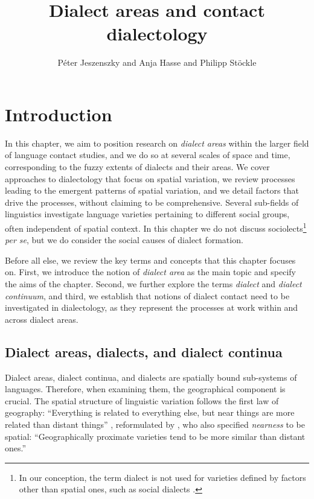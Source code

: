 \documentclass[output=paper]{langscibook}
\title{Dialect areas and contact dialectology}
\author{Péter Jeszenszky\affiliation{University of Bern} and  Anja Hasse\affiliation{University of Zurich} and  Philipp Stöckle\affiliation{Austrian Academy of Sciences, Vienna}}
\begin{document}
\maketitle
\label{chap_dialects}

\section{Introduction} 
\label{Section:Introduction}

In this chapter, we aim to position research on \textit{dialect areas} within the larger field of language contact studies, and we do so at several scales of space and time, corresponding to the fuzzy extents of dialects and their areas. We cover approaches to dialectology that focus on spatial variation, we review processes leading to the emergent patterns of spatial variation, and we detail factors that drive the processes, without claiming to be comprehensive.
Several sub-fields of linguistics investigate language varieties pertaining to different social groups, often independent of spatial context. In this chapter we do not discuss sociolects\footnote{In our conception, the term dialect is not used for varieties defined by factors other than spatial ones, such as social dialects \parencite[cf.][7--9]{Chambers2004}.}
\textit{per se}, but we do consider the social causes of dialect formation.

Before all else, we review the key terms and concepts that this chapter focuses on. First, we introduce the notion of \textit{dialect area} as the main topic and specify the aims of the chapter. Second, we further explore the terms \textit{dialect} and \textit{dialect continuum}, and third, we establish that notions of dialect contact need to be investigated in dialectology, as they represent the processes at work within and across dialect areas.

\subsection{Dialect areas, dialects, and dialect continua}
\label{Intro:Dialects_and_dialect_areas}
Dialect areas, dialect continua, and dialects are spatially bound sub-systems of languages. Therefore, when examining them, the geographical component is crucial. The spatial structure of linguistic variation follows the first law of geography: “Everything is related to everything else, but near things are more related than distant things” \parencite[][236]{Tobler1970}, reformulated by \textcite[][154]{Nerbonne2007c}, who also specified \textit{nearness} to be spatial: “Geographically proximate varieties tend to be more similar than distant ones.” 
\end{document}
